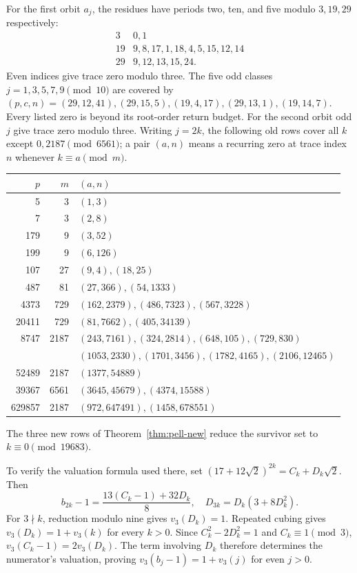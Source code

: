 \documentclass[11pt,a4paper]{article}
\theoremstyle{remark}\newtheorem{remark}[theorem]{Remark}
\begin{document}
For the first orbit $a_j$, the residues have periods two, ten, and
five modulo $3,19,29$ respectively:
\[
\begin{array}{c|l}
3&0,1\\
19&9,8,17,1,18,4,5,15,12,14\\
29&9,12,13,15,24.
\end{array}
\]
Even indices give trace zero modulo three. The five odd classes
$j=1,3,5,7,9\pmod{10}$ are covered by
$(p,c,n)=(29,12,41),(29,15,5),(19,4,17),(29,13,1),(19,14,7)$.
Every listed zero is beyond its root-order return budget.
For the second orbit odd $j$ give trace zero modulo three. Writing
$j=2k$, the following old rows cover all $k$ except
$0,2187\pmod{6561}$; a pair $(a,n)$ means a recurring zero at
trace index $n$ whenever $k\equiv a\pmod m$.
\begin{center}\small
\begin{tabular}{r r l}
\toprule
$p$&$m$&$(a,n)$\\\midrule
5&3&$(1,3)$\\
7&3&$(2,8)$\\
179&9&$(3,52)$\\
199&9&$(6,126)$\\
107&27&$(9,4),(18,25)$\\
487&81&$(27,366),(54,1333)$\\
4373&729&$(162,2379),(486,7323),(567,3228)$\\
20411&729&$(81,7662),(405,34139)$\\
8747&2187&$(243,7161),(324,2814),(648,105),(729,830)$\\
&&$(1053,2330),(1701,3456),(1782,4165),(2106,12465)$\\
52489&2187&$(1377,54889)$\\
39367&6561&$(3645,45679),(4374,15588)$\\
629857&2187&$(972,647491),(1458,678551)$\\
\bottomrule
\end{tabular}
\end{center}
The three new rows of Theorem~\ref{thm:pell-new} reduce the survivor
set to $k\equiv0\pmod{19683}$.

To verify the valuation formula used there, set
$(17+12\sqrt2)^{2k}=C_k+D_k\sqrt2$. Then
\[
 b_{2k}-1=\frac{13(C_k-1)+32D_k}{8},\quad
 D_{3k}=D_k(3+8D_k^2).
\]
For $3\nmid k$, reduction modulo nine gives $v_3(D_k)=1$.
Repeated cubing gives $v_3(D_k)=1+v_3(k)$ for every $k>0$.
Since $C_k^2-2D_k^2=1$ and $C_k\equiv1\pmod3$,
$v_3(C_k-1)=2v_3(D_k)$. The term involving $D_k$ therefore
determines the numerator's valuation, proving
$v_3(b_j-1)=1+v_3(j)$ for even $j>0$.
\end{document}
